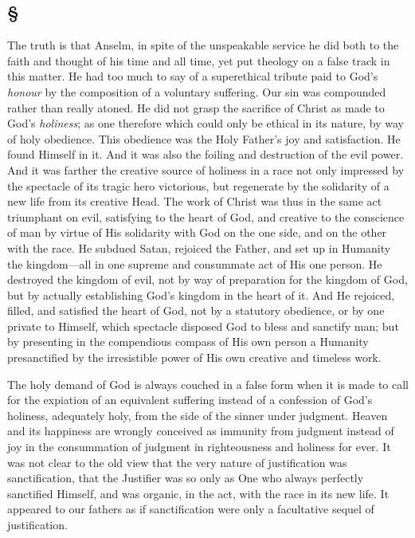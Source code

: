 \documentclass[draft]{ptfdoc}
\begin{document}
\subsection*{
\S
}

The truth is that Anselm, in spite of the 
unspeakable service he did both to the faith 
and thought of his time and all time, yet put 
theology on a false track in this matter. He 
had too much to say of a superethical tribute 
paid to God's \textit{honour} by the composition of a 
voluntary suffering. Our sin was compounded 
rather than really atoned. He did not grasp the 
sacrifice of Christ as made to God's \textit{holiness}; as 
one therefore which could only be ethical in its 
nature, by way of holy obedience. This obedience 
was the Holy Father's joy and satisfaction. He 
found Himself in it. And it was also the foiling 
and destruction of the evil power. And it was 
farther the creative source of holiness in a race 
not only impressed by the spectacle of its tragic 
hero victorious, but regenerate by the solidarity 
of a new life from its creative Head. The work 
of Christ was thus in the same act triumphant 
on evil, satisfying to the heart of God, and 
creative to the conscience of man by virtue of 
His solidarity with God on the one side, and on 
the other with the race. He subdued Satan, 
rejoiced the Father, and set up in Humanity the 
kingdom---all in one supreme and consummate 
act of His one person. He destroyed the kingdom 
of evil, not by way of preparation for the 
kingdom of God, but by actually establishing 
God's kingdom in the heart of it. And He rejoiced, 
filled, and satisfied the heart of God, not 
by a statutory obedience, or by one private to 
Himself, which spectacle disposed God to bless 
and sanctify man; but by presenting in the 
compendious compass of His own person a 
Humanity presanctified by the irresistible 
power of His own creative and timeless work. 

The holy demand of God is always couched in 
a false form when it is made to call for the 
expiation of an equivalent suffering instead of a 
confession of God's holiness, adequately holy, 
from the side of the sinner under judgment. 
Heaven and its happiness are wrongly conceived 
as immunity from judgment instead of joy in 
the consummation of judgment in righteousness 
and holiness for ever. It was not clear to the 
old view that the very nature of justification 
was sanctification, that the Justifier was so only 
as One who always perfectly sanctified Himself, 
and was organic, in the act, with the race in its 
new life. It appeared to our fathers as if sanctification 
were only a facultative sequel of justification. 
\end{document}
